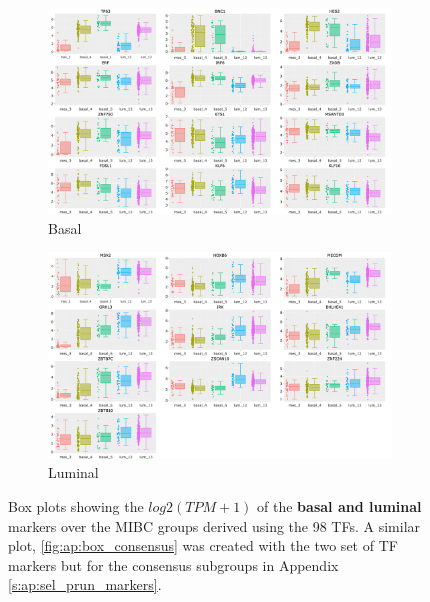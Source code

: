 \begin{figure}[H]
    \centering
    \begin{subfigure}[!t]{1.0\textwidth}
        \includegraphics[width=1.0\textwidth,height=1.0\textheight,keepaspectratio]{Sections/Network_I/Resources/selective_pruning/log2_dendrogram_basal.png}
        \caption{Basal}
        \label{fig:N_I:box_basal_dendrogram}
    \end{subfigure}
    \begin{subfigure}[!t]{1.0\textwidth}
      \includegraphics[width=1.0\textwidth,height=1.0\textheight,keepaspectratio]{Sections/Network_I/Resources/selective_pruning/log2_dendrogram_lum.png}
      \caption{Luminal}
      \label{fig:N_I:box_luminal_dendrogram}
    \end{subfigure}
    \caption{Box plots showing the $log2(TPM+1)$ of the \textbf{basal and luminal} markers over the MIBC groups derived using the 98 TFs. A similar plot, \cref{fig:ap:box_consensus} was created with the two set of TF markers but for the consensus \citep{Kamoun2020-tj} subgroups in Appendix \cref{s:ap:sel_prun_markers}.}
    \label{fig:N_I:box_basal}
\end{figure}




